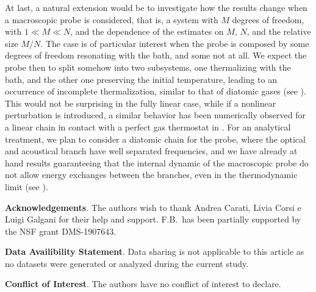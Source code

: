 \documentclass[11pt]{article}
\numberwithin{equation}{section}
\numberwithin{theorem}{section}
\begin{document}
At last, a natural extension would be to investigate how the results change when a macroscopic probe is considered, that
is, a system with $M$ degrees of freedom, with $1\ll M\ll N$, and the dependence of the estimates on $M$, $N$, and the
relative size $M/N$. The case is of particular interest when the probe is composed by some degrees of freedom resonating
with the bath, and some not at all. We expect the probe then to split somehow into two subsystems, one thermalizing with
the bath, and the other one preserving the initial temperature, leading to an occurrence of incomplete thermalization,
similar to that of diatomic gases (see \cite{BCG95}). This would not be surprising in the fully linear case, while if a
nonlinear perturbation is introduced, a similar behavior has been numerically observed for a linear chain in contact
with a perfect gas thermostat in \cite{CCG04}. For an analytical treatment, we plan to consider a diatomic chain for the
probe, where the optical and acoustical branch have well separated frequencies, and we have already at hand results
guaranteeing that the internal dynamic of the macroscopic probe do not allow energy exchanges between the branches, even
in the thermodynamic limit (see \cite{Mai19}).
\bigskip

\noindent
{\bf Acknowledgements}. The authors wish to thank Andrea Carati, Livia Corsi e Luigi Galgani for their help and support. F.B.~has been partially supported by the NSF grant DMS-1907643.


\medskip

\noindent
{\bf Data Availibility Statement}.
Data sharing is not applicable to this article as no datasets were generated or analyzed
during the current study.

\medskip

\noindent
{\bf Conflict of Interest}.
The authors have no conflict of interest to declare.



%
\end{document}
